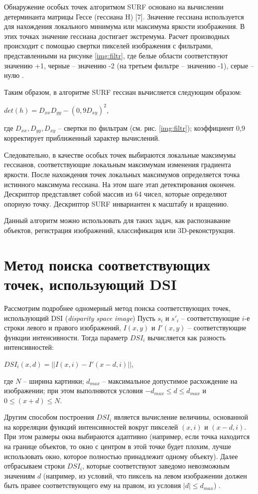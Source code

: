 Обнаружение особых точек алгоритмом SURF основано на вычислении детерминанта матрицы Гессе (гессиана H) [7]. Значение гессиана используется для нахождения
локального минимума или максимума яркости изображения. В этих точках значение
гессиана достигает экстремума. Расчет производных происходит с помощью свертки
пикселей изображения с фильтрами, представленными на рисунке \ref{img:filtr}, где белые области соответствуют значению +1, черные -- значению -2 (на третьем фильтре -- значению -1), серые -- нулю \cite{SURF2}. 


Таким образом, в алгоритме SURF гессиан вычисляется следующим образом:

$det(h)=D_{xx}D_{yy}-(0,9D_{xy})^2$,

где $D_{xx}, D_{yy}, D_{xy}$ -- свертки по фильтрам (см. рис. \ref{img:filtr}); коэффициент 0,9 корректирует приближенный характер вычислений.

Следовательно, в качестве особых точек выбираются локальные максимумы гессианов, соответствующие локальным максимумам изменения градиента яркости. После нахождения точек локальных максимумов определяется точка истинного максимума гессиана. На этом шаге этап детектирования окончен. Дескриптор представляет собой массив из 64 чисел, которые определяют опорную точку. Дескриптор SURF инвариантен к масштабу и вращению.

Данный алгоритм можно использовать для таких задач, как распознавание объектов, регистрация изображений, классификация или 3D-реконструкция.

\section{Метод поиска соответствующих точек, использующий DSI}
Рассмотрим подробнее одномерный метод поиска
соответствующих точек, использующий DSI (\textit{disparity
space image}) \cite{6}
Пусть $s_i$ и $s'_i$ – соответствующие
$i$-е строки левого и правого изображений, $I(x,y)$ и
$I'(x,y)$ – соответствующие функции интенсивности.
Тогда параметр $DSI_i$ вычисляется как разность интенсивностей:

$DSI_i(x,d)=||I(x,i)-I'(x-d,i)||$,

где $N$ -- ширина картинки; $d_{max}$ -- максимальное допустимое расхождение на изображении; при этом выполняются условия $-d_{max} ≤ d ≤ d_{max}$ и $0 ≤ (x + d) ≤ N$.

Другим способом построения $DSI_i$ является вычисление величины, основанной на корреляции функций интенсивностей вокруг пикселей $(x,i)$ и $(x - d,i)$.
При этом размеры окна выбираются адаптивно (например, если точка находится на границе объектов, то
окно с центром в этой точке будет плохим, лучше
использовать окно, которое полностью принадлежит
одному объекту). Далее отбрасываем строки $DSI_i$,
которые соответствуют заведомо невозможным значениям $d$ (например, из условий, что пиксель на левом
изображении должен быть правее соответствующего
ему на правом, из условия $|d| ≤ d_{max}$) \cite{DSI}.

